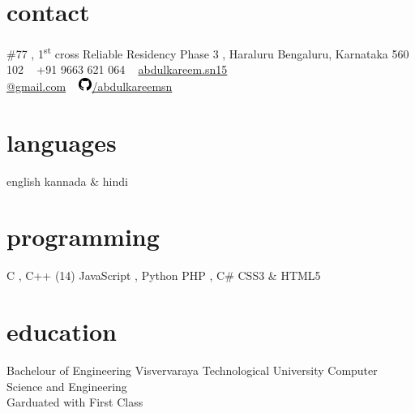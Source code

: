 \documentclass[]{friggeri-cv} %
\begin{document}


\begin{aside} %
\section{contact}
\#77 , 1\textsuperscript{st}  cross
Reliable Residency Phase 3 , Haraluru
Bengaluru, Karnataka 560 102
~
+91 9663 621 064
~
\href{mailto:abdulkareem.sn15@gmail.com}{abdulkareem.sn15\\@gmail.com}
~
\href{https://github.com/abdulkareemsn}{\includegraphics[scale=0.6]{github}/abdulkareemsn}
\section{languages}
english 
kannada \& hindi
\section{programming}
C , C++ (14)
JavaScript , Python
PHP , C\#
CSS3 \& HTML5
\end{aside}


\section{education}

\begin{entrylist}


{Bachelour {\normalfont of Engineering}}
{Visvervaraya Technological University}
{Computer Science and Engineering\\Garduated with First Class}






\end{entrylist}
\end{document}
